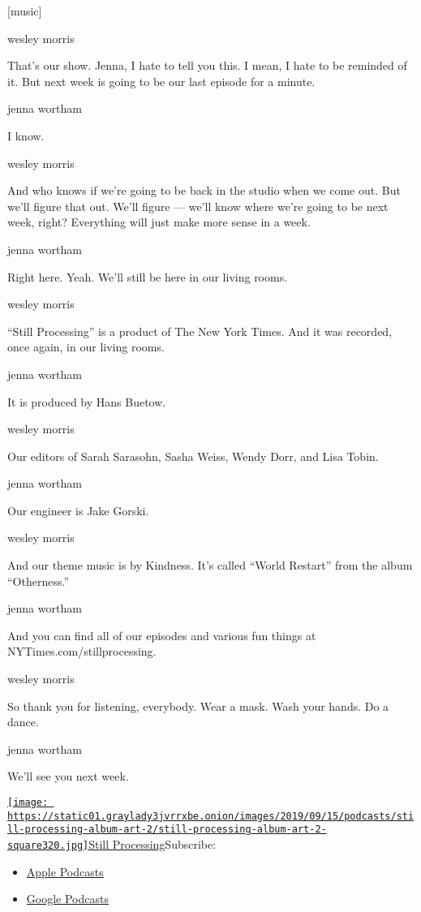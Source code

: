 {[}music{]}

wesley morris

That's our show. Jenna, I hate to tell you this. I mean, I hate to be
reminded of it. But next week is going to be our last episode for a
minute.

jenna wortham

I know.

wesley morris

And who knows if we're going to be back in the studio when we come out.
But we'll figure that out. We'll figure --- we'll know where we're going
to be next week, right? Everything will just make more sense in a week.

jenna wortham

Right here. Yeah. We'll still be here in our living rooms.

wesley morris

``Still Processing'' is a product of The New York Times. And it was
recorded, once again, in our living rooms.

jenna wortham

It is produced by Hans Buetow.

wesley morris

Our editors of Sarah Sarasohn, Sasha Weiss, Wendy Dorr, and Lisa Tobin.

jenna wortham

Our engineer is Jake Gorski.

wesley morris

And our theme music is by Kindness. It's called ``World Restart'' from
the album ``Otherness.''

jenna wortham

And you can find all of our episodes and various fun things at
NYTimes.com/stillprocessing.

wesley morris

So thank you for listening, everybody. Wear a mask. Wash your hands. Do
a dance.

jenna wortham

We'll see you next week.

\href{https://www.nytimes3xbfgragh.onion/column/still-processing-podcast}{\texttt{[image: https://static01.graylady3jvrrxbe.onion/images/2019/09/15/podcasts/still-processing-album-art-2/still-processing-album-art-2-square320.jpg]}Still
Processing}Subscribe:

\begin{itemize}
\tightlist
\item
  \href{https://itunes.apple.com/us/podcast/id1151436460}{Apple
  Podcasts}
\item
  \href{https://www.google.com/podcasts?feed=aHR0cHM6Ly9yc3MuYXJ0MTkuY29tL255dC1zdGlsbC1wcm9jZXNzaW5n}{Google
  Podcasts}
\end{itemize}

